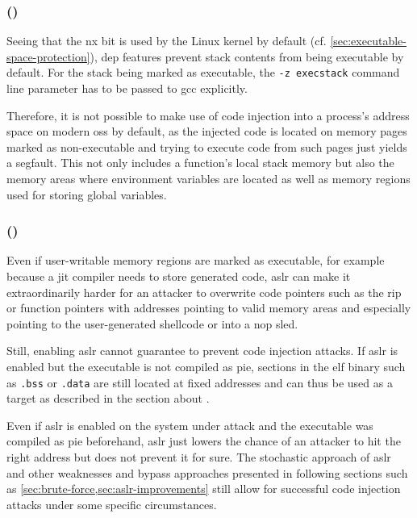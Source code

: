 \subsubsection{ ()}
\label{subsubsec:ci-data-execution-prevention}

Seeing that the \gls{nx} bit is used by the Linux kernel by default (cf. \cref{sec:executable-space-protection}), \gls{dep} features prevent stack contents from being executable by default.
For the stack being marked as executable, the \texttt{-z execstack} command line parameter has to be passed to \gls{gcc} explicitly.

Therefore, it is not possible to make use of code injection into a process's address space on modern \glspl{os} by default, as the injected code is located on memory pages marked as non-executable and trying to execute code from such pages just yields a \gls{segfault}.
This not only includes a function's local stack memory but also the memory areas where environment variables are located as well as memory regions used for storing global variables.

\subsubsection{ ()}
\label{subsubsec:ci-aslr}

Even if user-writable memory regions are marked as executable, for example because a \gls{jit} compiler needs to store generated code, \gls{aslr} can make it extraordinarily harder for an attacker to overwrite code pointers such as the \gls{rip} or function pointers with addresses pointing to valid memory areas and especially pointing to the user-generated shellcode or into a \gls{nop} sled.

Still, enabling \gls{aslr} cannot guarantee to prevent code injection attacks.
If \gls{aslr} is enabled but the executable is not compiled as \gls{pie}, sections in the \gls{elf} binary such as \texttt{.bss} or \texttt{.data} are still located at fixed addresses and can thus be used as a target as described in the section about .

Even if \gls{aslr} is enabled on the system under attack and the executable was compiled as \gls{pie} beforehand, \gls{aslr} just lowers the chance of an attacker to hit the right address but does not prevent it for sure.
The stochastic approach of \gls{aslr} and other weaknesses and bypass approaches presented in following sections such as \cref{sec:brute-force,sec:aslr-improvements} still allow for successful code injection attacks under some specific circumstances.

